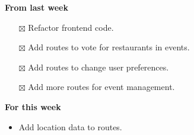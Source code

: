 \documentclass[12pt,letterpaper]{article}
\newcommand{\done}{$\boxtimes$}
\begin{document}
\textbf{From last week}
\begin{itemize}
  \item[\done] Refactor frontend code.
  \item[\done] Add routes to vote for restaurants in events.
  \item[\done] Add routes to change user preferences.
  \item[\done] Add more routes for event management.
\end{itemize}


\textbf{For this week}
\begin{itemize}
  \item Add location data to routes.
\end{itemize}
\end{document}

